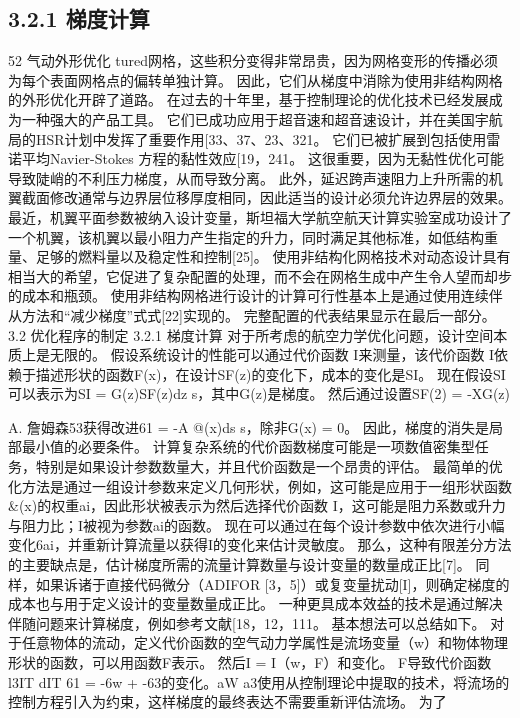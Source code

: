 \documentclass[UTF8,11pt,a4paper,openany,fontset=fandol]{ctexbook}
\begin{document}
\subsection{3.2.1 梯度计算}
52 气动外形优化 tured网格，这些积分变得非常昂贵，因为网格变形的传播必须为每个表面网格点的偏转单独计算。 因此，它们从梯度中消除为使用非结构网格的外形优化开辟了道路。 在过去的十年里，基于控制理论的优化技术已经发展成为一种强大的产品工具。 它们已成功应用于超音速和超音速设计，并在美国宇航局的HSR计划中发挥了重要作用[33、37、23、321。 它们已被扩展到包括使用雷诺平均Navier-Stokes 方程的黏性效应[19，241。 这很重要，因为无黏性优化可能导致陡峭的不利压力梯度，从而导致分离。 此外，延迟跨声速阻力上升所需的机翼截面修改通常与边界层位移厚度相同，因此适当的设计必须允许边界层的效果。 最近，机翼平面参数被纳入设计变量，斯坦福大学航空航天计算实验室成功设计了一个机翼，该机翼以最小阻力产生指定的升力，同时满足其他标准，如低结构重量、足够的燃料量以及稳定性和控制[25]。 使用非结构化网格技术对动态设计具有相当大的希望，它促进了复杂配置的处理，而不会在网格生成中产生令人望而却步的成本和瓶颈。 使用非结构网格进行设计的计算可行性基本上是通过使用连续伴从方法和“减少梯度”式式[22]实现的。 完整配置的代表结果显示在最后一部分。 3.2 优化程序的制定 3.2.1 梯度计算 对于所考虑的航空力学优化问题，设计空间本质上是无限的。 假设系统设计的性能可以通过代价函数 I来测量，该代价函数 I依赖于描述形状的函数F(x)，在设计SF(z)的变化下，成本的变化是SI。 现在假设SI可以表示为SI = G(z)SF(z)dz s，其中G(z)是梯度。 然后通过设置SF(2) = -XG(z)

A. 詹姆森53获得改进61 = -A @(x)ds s，除非G(x) = 0。 因此，梯度的消失是局部最小值的必要条件。 计算复杂系统的代价函数梯度可能是一项数值密集型任务，特别是如果设计参数数量大，并且代价函数是一个昂贵的评估。 最简单的优化方法是通过一组设计参数来定义几何形状，例如，这可能是应用于一组形状函数\&(x)的权重ai，因此形状被表示为然后选择代价函数 I，这可能是阻力系数或升力与阻力比；I被视为参数ai的函数。 现在可以通过在每个设计参数中依次进行小幅变化6ai，并重新计算流量以获得I的变化来估计灵敏度。 那么，这种有限差分方法的主要缺点是，估计梯度所需的流量计算数量与设计变量的数量成正比[7]。 同样，如果诉诸于直接代码微分（ADIFOR [3，5]）或复变量扰动[I]，则确定梯度的成本也与用于定义设计的变量数量成正比。 一种更具成本效益的技术是通过解决伴随问题来计算梯度，例如参考文献[18，12，111。 基本想法可以总结如下。 对于任意物体的流动，定义代价函数的空气动力学属性是流场变量（w）和物体物理形状的函数，可以用函数F表示。 然后I = I（w，F）和变化。 F导致代价函数 l3IT dIT 61 = -6w + -63的变化。aW a3使用从控制理论中提取的技术，将流场的控制方程引入为约束，这样梯度的最终表达不需要重新评估流场。 为了
\end{document}
